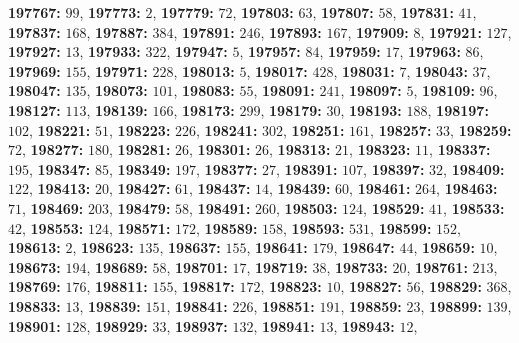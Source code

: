 \textsf{\bfseries 197767:} $99$, \textsf{\bfseries 197773:} $2$, \textsf{\bfseries 197779:} $72$, \textsf{\bfseries 197803:} $63$, \textsf{\bfseries 197807:} $58$, \textsf{\bfseries 197831:} $41$, \textsf{\bfseries 197837:} $168$, \textsf{\bfseries 197887:} $384$, \textsf{\bfseries 197891:} $246$, \textsf{\bfseries 197893:} $167$, \textsf{\bfseries 197909:} $8$, \textsf{\bfseries 197921:} $127$, \textsf{\bfseries 197927:} $13$, \textsf{\bfseries 197933:} $322$, \textsf{\bfseries 197947:} $5$, \textsf{\bfseries 197957:} $84$, \textsf{\bfseries 197959:} $17$, \textsf{\bfseries 197963:} $86$, \textsf{\bfseries 197969:} $155$, \textsf{\bfseries 197971:} $228$, \textsf{\bfseries 198013:} $5$, \textsf{\bfseries 198017:} $428$, \textsf{\bfseries 198031:} $7$, \textsf{\bfseries 198043:} $37$, \textsf{\bfseries 198047:} $135$, \textsf{\bfseries 198073:} $101$, \textsf{\bfseries 198083:} $55$, \textsf{\bfseries 198091:} $241$, \textsf{\bfseries 198097:} $5$, \textsf{\bfseries 198109:} $96$, \textsf{\bfseries 198127:} $113$, \textsf{\bfseries 198139:} $166$, \textsf{\bfseries 198173:} $299$, \textsf{\bfseries 198179:} $30$, \textsf{\bfseries 198193:} $188$, \textsf{\bfseries 198197:} $102$, \textsf{\bfseries 198221:} $51$, \textsf{\bfseries 198223:} $226$, \textsf{\bfseries 198241:} $302$, \textsf{\bfseries 198251:} $161$, \textsf{\bfseries 198257:} $33$, \textsf{\bfseries 198259:} $72$, \textsf{\bfseries 198277:} $180$, \textsf{\bfseries 198281:} $26$, \textsf{\bfseries 198301:} $26$, \textsf{\bfseries 198313:} $21$, \textsf{\bfseries 198323:} $11$, \textsf{\bfseries 198337:} $195$, \textsf{\bfseries 198347:} $85$, \textsf{\bfseries 198349:} $197$, \textsf{\bfseries 198377:} $27$, \textsf{\bfseries 198391:} $107$, \textsf{\bfseries 198397:} $32$, \textsf{\bfseries 198409:} $122$, \textsf{\bfseries 198413:} $20$, \textsf{\bfseries 198427:} $61$, \textsf{\bfseries 198437:} $14$, \textsf{\bfseries 198439:} $60$, \textsf{\bfseries 198461:} $264$, \textsf{\bfseries 198463:} $71$, \textsf{\bfseries 198469:} $203$, \textsf{\bfseries 198479:} $58$, \textsf{\bfseries 198491:} $260$, \textsf{\bfseries 198503:} $124$, \textsf{\bfseries 198529:} $41$, \textsf{\bfseries 198533:} $42$, \textsf{\bfseries 198553:} $124$, \textsf{\bfseries 198571:} $172$, \textsf{\bfseries 198589:} $158$, \textsf{\bfseries 198593:} $531$, \textsf{\bfseries 198599:} $152$, \textsf{\bfseries 198613:} $2$, \textsf{\bfseries 198623:} $135$, \textsf{\bfseries 198637:} $155$, \textsf{\bfseries 198641:} $179$, \textsf{\bfseries 198647:} $44$, \textsf{\bfseries 198659:} $10$, \textsf{\bfseries 198673:} $194$, \textsf{\bfseries 198689:} $58$, \textsf{\bfseries 198701:} $17$, \textsf{\bfseries 198719:} $38$, \textsf{\bfseries 198733:} $20$, \textsf{\bfseries 198761:} $213$, \textsf{\bfseries 198769:} $176$, \textsf{\bfseries 198811:} $155$, \textsf{\bfseries 198817:} $172$, \textsf{\bfseries 198823:} $10$, \textsf{\bfseries 198827:} $56$, \textsf{\bfseries 198829:} $368$, \textsf{\bfseries 198833:} $13$, \textsf{\bfseries 198839:} $151$, \textsf{\bfseries 198841:} $226$, \textsf{\bfseries 198851:} $191$, \textsf{\bfseries 198859:} $23$, \textsf{\bfseries 198899:} $139$, \textsf{\bfseries 198901:} $128$, \textsf{\bfseries 198929:} $33$, \textsf{\bfseries 198937:} $132$, \textsf{\bfseries 198941:} $13$, \textsf{\bfseries 198943:} $12$, 
